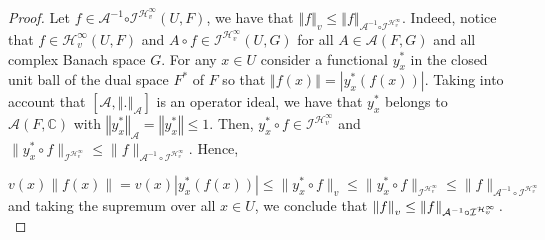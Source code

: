 \documentclass[12pt]{amsart}
\theoremstyle{plain}
\numberwithin{equation}{section}
\begin{document}
\begin{proof}
Let $f\in \mathcal{A}^{-1}\mathcal{\circ I}^{\mathcal{H}_{v}^{\infty
}}\left( U,F\right) $, we have that $\left\Vert f\right\Vert _{v}\leq
\left\Vert f\right\Vert _{\mathcal{A}^{-1}\mathcal{\circ I}^{\mathcal{H}%
_{v}^{\infty }}}$. Indeed, notice that $f\in \mathcal{H}_{v}^{\infty }\left(
U,F\right) $ and $A\circ f\in \mathcal{I}^{\mathcal{H}_{v}^{\infty }}\left(
U,G\right) $ for all $A\in \mathcal{A}\left( F,G\right) $ and all 
complex Banach space $G$. For any $x\in U$ consider a functional $y^{\ast }_x$ in the closed unit ball of the dual space $F^{\ast }$ of $F$ so that $\left\Vert
f\left( x\right) \right\Vert =\left\vert y^{\ast }_x\left( f\left( x\right)
\right) \right\vert $. Taking into account that $\left[ \mathcal{A}%
,\left\Vert .\right\Vert _{\mathcal{A}}\right] $ is an operator ideal,
we have that  $y^{\ast }_x$ belongs to $\mathcal{A}\left( F,\mathbb{C}\right) $
with $\left\Vert y^{\ast }_x\right\Vert _{\mathcal{A}}=\left\Vert
y^{\ast }_x\right\Vert \leq 1$. Then, $y^*_x\circ f\in \mathcal{ I}^{\mathcal{H}_{v}^{\infty
}}$ and $\|y_x^{\ast}\circ f\|_{\mathcal I^{\mathcal H_v^\infty}}\leq \|f\|_{\mathcal A^{-1}\circ \mathcal I^{\mathcal H_v^\infty}}$. Hence, 

$$
v(x)\|f(x)\|=v(x)|y_x^*(f(x))|\leq \|y_x^*\circ f\|_v\leq \|y_x^*\circ f\|_{\mathcal I^{\mathcal H_v^\infty}}\leq \|f\|_{\mathcal A^{-1}\circ \mathcal I^{\mathcal H_v^\infty}}
$$
and taking the supremum over all $x\in U$, we conclude that $\left\Vert
f\right\Vert _{v}\leq \left\Vert f\right\Vert _{\mathcal{A}^{-1}\mathcal{%
\circ I}^{\mathcal{H}_{v}^{\infty }}}.$


\end{proof}
\end{document}
